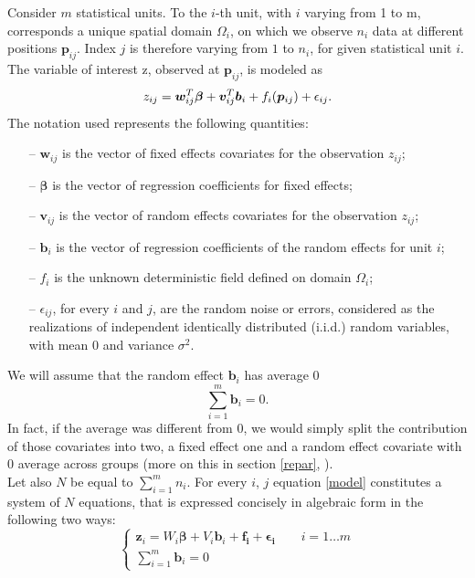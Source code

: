 Consider $m$ statistical units. To the $i$-th unit, with $i$ varying from 1 to
m, corresponds a unique spatial domain $\Omega_i$, on which we observe $n_i$
data at different positions $\bm{p}_{ij}$. Index $j$ is therefore varying from
$1$ to $n_i$, for given statistical unit $i$.\\The variable of interest z,
observed at $\bm{p}_{ij}$, is modeled as
\begin{equation}
	\label{model}
	z_{ij} = \bm{w}^T_{ij} \bm{\beta} + \bm{v}^T_{ij} \bm{b}_i + f_i(\bm{p_}{ij}) + \epsilon_{ij}.
\end{equation}
The notation used represents the following quantities:
\begin{itemize}
	\item[--] $\bm{w}_{ij}$ is the vector of fixed effects covariates for the
		observation $z_{ij}$; \item[--] $\bm{\beta}$ is the vector of regression
		coefficients for fixed effects; \item[--] $\bm{v}_{ij}$ is the vector of random
		effects covariates for the observation $z_{ij}$; \item[--] $\bm{b}_i$ is the
		vector of regression coefficients of the random effects for unit $i$; \item[--]
		$f_i$ is the unknown deterministic field defined on domain $\Omega_i$;
	\item[--] $\epsilon_{ij}$, for every $i$ and $j$, are the random noise or
		errors, considered as the realizations of independent identically distributed
		(i.i.d.) random variables, with mean $0$ and variance $\sigma^2$.
\end{itemize}
We will assume that the random effect $\bm{b}_i$ has average $0$
\begin{equation}
	\label{constraint}
	\sum_{i=1}^{m}{\bm{b}_i}=0.
\end{equation}
In fact, if the average was different from 0, we would simply split
the contribution of those covariates into two, a fixed effect one and a random
effect covariate with 0 average across groups (more on this in section
\ref{repar}, ). \\ Let also $N$ be equal to $\sum_{i=1}^{m}n_i$.
For every $i$, $j$ equation \ref{model} constitutes a system of $N$ equations,
that is expressed concisely in algebraic form in the following two ways:
\begin{equation}
	\begin{cases}
		\bm{z}_i = W_i \bm{\beta} + V_i \bm{b}_i + \bm{f_i} + \bm{\epsilon_i} \qquad
		i=1\dots m \\
		\sum_{i=1}^{m}{\bm{b}_i}=0
	\end{cases}
\end{equation}
